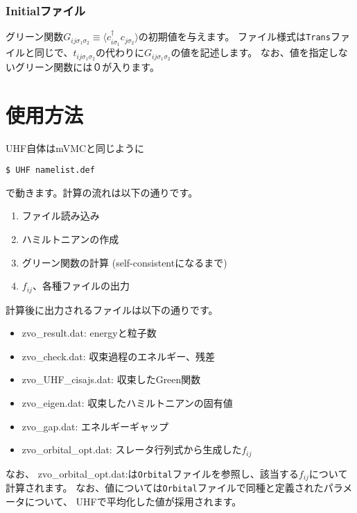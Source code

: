 \subsubsection{Initialファイル}
グリーン関数$G_{ij\sigma_1\sigma_2}\equiv \langle c_{i\sigma_1}^\dag c_{j\sigma_2}\rangle$の初期値を与えます。
ファイル様式は\verb|Trans|ファイルと同じで、$t_{ij\sigma_1\sigma_2}$の代わりに$G_{ij\sigma_1\sigma_2}$の値を記述します。
なお、値を指定しないグリーン関数には０が入ります。

\section{使用方法}
UHF自体はmVMCと同じように
\begin{verbatim}
$ UHF namelist.def
\end{verbatim}
で動きます。計算の流れは以下の通りです。
\begin{enumerate}
\item{ファイル読み込み}
\item{ハミルトニアンの作成}
\item{グリーン関数の計算 (self-consistentになるまで)}
\item{$f_{ij}$、各種ファイルの出力}
\end{enumerate}
計算後に出力されるファイルは以下の通りです。
\begin{itemize}
\item{zvo\_result.dat:}  energyと粒子数
\item{zvo\_check.dat:} 収束過程のエネルギー、残差
\item{zvo\_UHF\_cisajs.dat:} 収束したGreen関数
\item{zvo\_eigen.dat:} 収束したハミルトニアンの固有値
\item{zvo\_gap.dat:} エネルギーギャップ
\item{zvo\_orbital\_opt.dat:} スレータ行列式から生成した$f_{ij}$
\end{itemize}
なお、 zvo\_orbital\_opt.dat:は\verb|Orbital|ファイルを参照し、該当する$f_{ij}$について計算されます。
なお、値については\verb|Orbital|ファイルで同種と定義されたパラメータについて、
UHFで平均化した値が採用されます。



